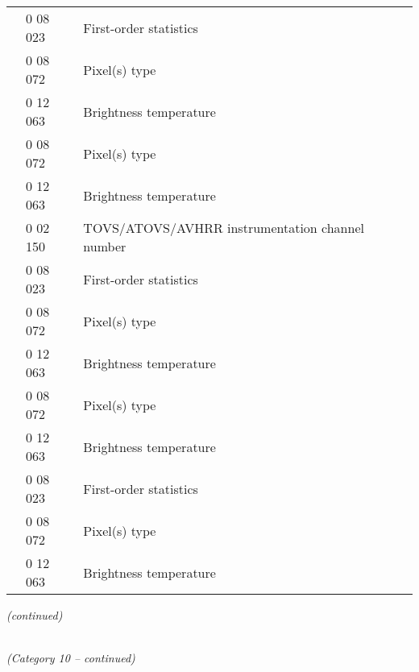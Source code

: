 \begin{longtable}[]{@{}llll@{}}
& 0 08 023 & First-order statistics &\tabularnewline
& 0 08 072 & Pixel(s) type &\tabularnewline
& 0 12 063 & Brightness temperature &\tabularnewline
& 0 08 072 & Pixel(s) type &\tabularnewline
& 0 12 063 & Brightness temperature &\tabularnewline
& 0 02 150 & TOVS/ATOVS/AVHRR instrumentation channel number &\tabularnewline
& 0 08 023 & First-order statistics &\tabularnewline
& 0 08 072 & Pixel(s) type &\tabularnewline
& 0 12 063 & Brightness temperature &\tabularnewline
& 0 08 072 & Pixel(s) type &\tabularnewline
& 0 12 063 & Brightness temperature &\tabularnewline
& 0 08 023 & First-order statistics &\tabularnewline
& 0 08 072 & Pixel(s) type &\tabularnewline
& 0 12 063 & Brightness temperature &\tabularnewline
\bottomrule
\end{longtable}

\emph{(continued)}

\emph{\\
(Category 10 -- continued)}

